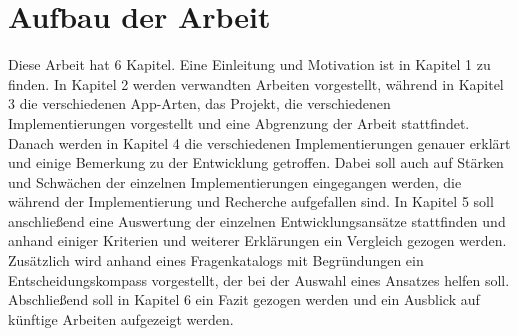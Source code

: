 \section{Aufbau der Arbeit}
Diese Arbeit hat 6 Kapitel. Eine Einleitung und Motivation ist in Kapitel 1 zu finden. In Kapitel 2 werden verwandten Arbeiten vorgestellt, während in Kapitel 3 die verschiedenen App-Arten, das Projekt, die verschiedenen Implementierungen vorgestellt und eine Abgrenzung der Arbeit stattfindet.
Danach werden in Kapitel 4 die verschiedenen Implementierungen genauer erklärt und einige Bemerkung zu der Entwicklung getroffen. Dabei soll auch auf Stärken und Schwächen der einzelnen Implementierungen eingegangen werden, die während der Implementierung und Recherche aufgefallen sind.
In Kapitel 5 soll anschließend eine Auswertung der einzelnen Entwicklungsansätze stattfinden und anhand einiger Kriterien und weiterer Erklärungen ein Vergleich gezogen werden. Zusätzlich wird anhand eines Fragenkatalogs mit Begründungen ein Entscheidungskompass vorgestellt, der bei der Auswahl eines Ansatzes helfen soll. Abschließend soll in Kapitel 6 ein Fazit gezogen werden und ein Ausblick auf künftige Arbeiten aufgezeigt werden.